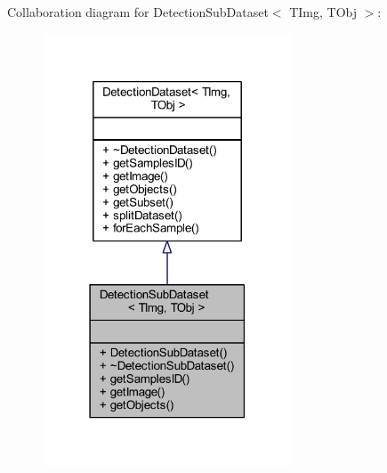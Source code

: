 Collaboration diagram for Detection\+Sub\+Dataset$<$ T\+Img, T\+Obj $>$\+:
\nopagebreak
\begin{figure}[H]
\begin{center}
\leavevmode
\includegraphics[width=210pt]{class_vision_core_1_1_evaluation_1_1_detection_sub_dataset__coll__graph}
\end{center}
\end{figure}
